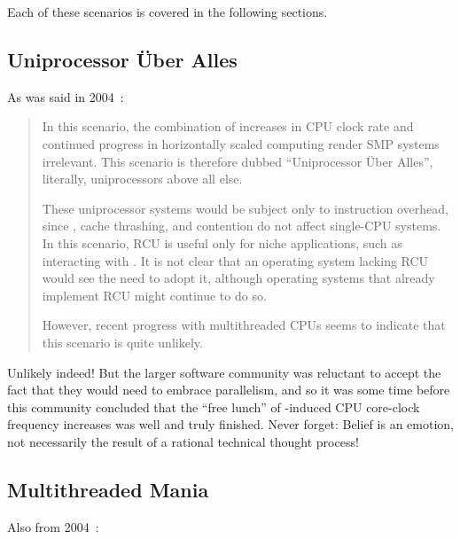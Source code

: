 Each of these scenarios is covered in the following sections.

\subsection{Uniprocessor \"Uber Alles}
\label{sec:future:Uniprocessor \"Uber Alles}

As was said in 2004~\cite{PaulEdwardMcKenneyPhD}:

\begin{quote}
	In this scenario, the combination of 
	increases in CPU
	clock rate and continued progress in horizontally scaled computing
	render SMP systems irrelevant.
	This scenario is therefore dubbed ``Uniprocessor \"Uber
	Alles'', literally, uniprocessors above all else.

	These uniprocessor systems would be subject only to instruction
	overhead, since , cache thrashing, and contention
	do not affect single-CPU systems.
	In this scenario, RCU is useful only for niche applications, such
	as interacting with .
	It is not clear that an operating system lacking RCU would see
	the need to adopt it, although operating
	systems that already implement RCU might continue to do so.

	However, recent progress with multithreaded CPUs seems to indicate
	that this scenario is quite unlikely.
\end{quote}

Unlikely indeed!
But the larger software community was reluctant to accept the fact that
they would need to embrace parallelism, and so it was some time before
this community concluded that the ``free lunch'' of
-induced
CPU core-clock frequency increases was well and truly finished.
Never forget:
Belief is an emotion, not necessarily the result of a rational technical
thought process!

\subsection{Multithreaded Mania}
\label{sec:future:Multithreaded Mania}

Also from 2004~\cite{PaulEdwardMcKenneyPhD}:

